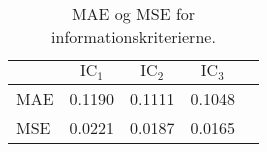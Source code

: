 \begin{table}
\center
\begin{tabular}{lcccc}
\toprule
& $\text{IC}_1$ & $\text{IC}_2$ & $\text{IC}_3$ \\
\midrule 
MAE & 0.1190 & 0.1111 & 0.1048  \\ 
MSE &  0.0221  & 0.0187  & 0.0165 \\ \bottomrule
 \end{tabular}
\caption{MAE og MSE for informationskriterierne.} \label{tab:factor_mse_tab}
\end{table}